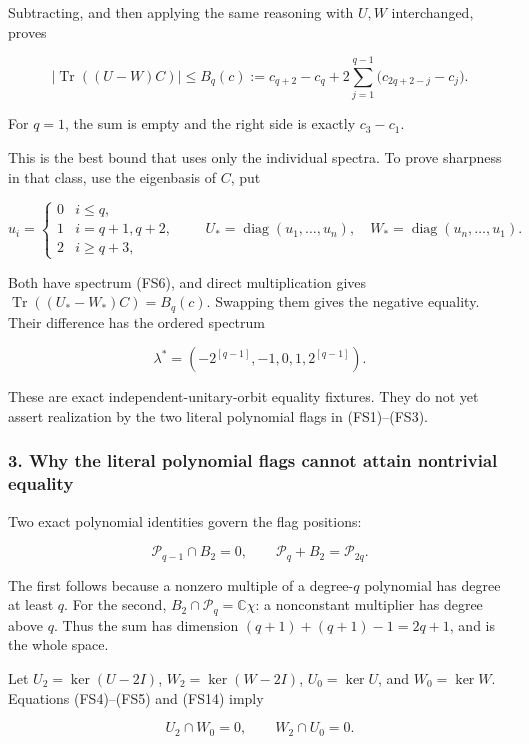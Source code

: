 Subtracting, and then applying the same reasoning with \(U,W\) interchanged, proves

\[
\boxed{
\left|\operatorname{Tr}((U-W)C)\right|
\le B_q(c):=
c_{q+2}-c_q+
2\sum_{j=1}^{q-1}\bigl(c_{2q+2-j}-c_j\bigr).
}
\tag{FS11}
\]

For \(q=1\), the sum is empty and the right side is exactly \(c_3-c_1\).

This is the best bound that uses only the individual spectra. To prove sharpness in that class, use the eigenbasis of \(C\), put

\[
u_i=\begin{cases}
0&i\le q,\\1&i=q+1,q+2,\\2&i\ge q+3,
\end{cases}
\qquad
U_*=\operatorname{diag}(u_1,\ldots,u_n),
\quad W_*=\operatorname{diag}(u_n,\ldots,u_1).
\tag{FS12}
\]

Both have spectrum (FS6), and direct multiplication gives \(\operatorname{Tr}((U_*-W_*)C)=B_q(c)\). Swapping them gives the negative equality. Their difference has the ordered spectrum

\[
\lambda^*=(-2^{[q-1]},-1,0,1,2^{[q-1]}).
\tag{FS13}
\]

These are exact independent-unitary-orbit equality fixtures. They do not yet assert realization by the two literal polynomial flags in (FS1)--(FS3).

\subsubsection{3. Why the literal polynomial flags cannot attain nontrivial equality}\label{endpoint-four_window_sharpness--why-the-literal-polynomial-flags-cannot-attain-nontrivial-equality}

Two exact polynomial identities govern the flag positions:

\[
\mathcal P_{q-1}\cap B_2=0,
\qquad \mathcal P_q+B_2=\mathcal P_{2q}.
\tag{FS14}
\]

The first follows because a nonzero multiple of a degree-\(q\) polynomial has degree at least \(q\). For the second, \(B_2\cap\mathcal P_q=\mathbb C\chi\): a nonconstant multiplier has degree above \(q\). Thus the sum has dimension \((q+1)+(q+1)-1=2q+1\), and is the whole space.

Let \(U_2=\ker(U-2I)\), \(W_2=\ker(W-2I)\), \(U_0=\ker U\), and \(W_0=\ker W\). Equations (FS4)--(FS5) and (FS14) imply

\[
U_2\cap W_0=0,
\qquad W_2\cap U_0=0.
\tag{FS15}
\]

